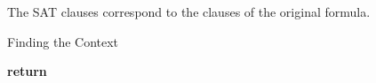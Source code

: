  The SAT clauses correspond to the clauses of the original formula.

  \begin{algorithm}[t]
\caption{Finding the Context}\label{alg:zoom} 
\begin{algorithmic}[1]
    \State \textbf{return}  

\EndProcedure

\EndProcedure
\end{algorithmic}
\end{algorithm}


  


